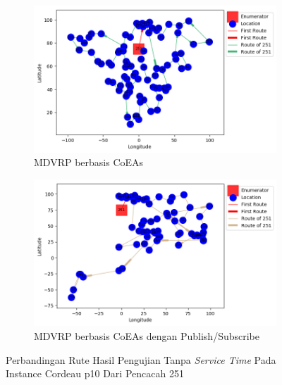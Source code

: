 \begin{figure}[H]
	\centering
	\begin{subfigure}[t]{\textwidth}
		\centering
		\includegraphics[width=\textwidth]{Resources/Images/cordeau_p10/cordeau_p10_notw_251_coes}
		\caption{MDVRP berbasis CoEAs}
		\label{fig:cordeau_p10_notw_251_coes}
	\end{subfigure}
	\begin{subfigure}[t]{\textwidth}
		\centering
		\includegraphics[width=\textwidth]{Resources/Images/cordeau_p10/cordeau_p10_notw_251_pubsub_coes}
		\caption{MDVRP berbasis CoEAs dengan Publish/Subscribe}
		\label{fig:cordeau_p10_notw_251_pubsub_coes}
	\end{subfigure}
	\caption{Perbandingan Rute Hasil Pengujian Tanpa \textit{Service Time} Pada Instance Cordeau p10 Dari Pencacah 251}
	\label{fig:cordeau_p10_notw_251}
\end{figure}


